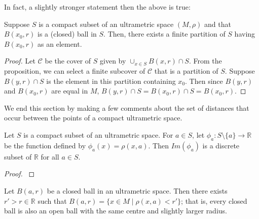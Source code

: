 In fact, a slightly stronger statement then the above is true:

\begin{corollary}
Suppose $S$ is a compact subset of an ultrametric space $(M, \rho)$ and that $B(x_0,r)$ is a (closed) ball in $S$. Then, there exists a finite partition of $S$ having $B(x_0,r)$ as an element.
\end{corollary}

\begin{proof}
Let $\mathcal{C}$ be the cover of $S$ given by $\cup_{x\in S} B(x,r) \cap S$. From the proposition, we can select a finite subcover of $\mathcal{C}$ that is a partition of $S$. Suppose $B(y,r) \cap S$ is the element in this partition containing $x_0$. Then  since $B(y,r)$ and $B(x_0,r)$ are equal in $M$, $B(y,r) \cap S = B(x_0,r) \cap S = B(x_0,r)$.
\end{proof}

We end this section by making a few comments about the set of distances that occur between the points of a compact ultrametric space.\\

\begin{proposition}
\cite{ar} Let $S$ is a compact subset of an ultrametric space. For $a \in S$, let $\phi_a: S \setminus \{a\} \rightarrow \mathbb{R}$ be the function defined by $\phi_a(x)=\rho(x,a)$. Then $Im(\phi_a)$ is a discrete subset of $\mathbb{R}$ for all $a \in S$.
\end{proposition}

\begin{proof}
\cite{ar} %
\end{proof}


\begin{corollary}
\cite{ar} Let $B(a, r)$ be a closed ball in an ultrametric space. Then there exists $ r' > r \in \mathbb{R}$ such that $B(a, r) = \{x \in M \mid \rho(x,a) < r'\} $; that is, every closed ball is also an open ball with the same centre and  slightly larger radius.
\end{corollary}

